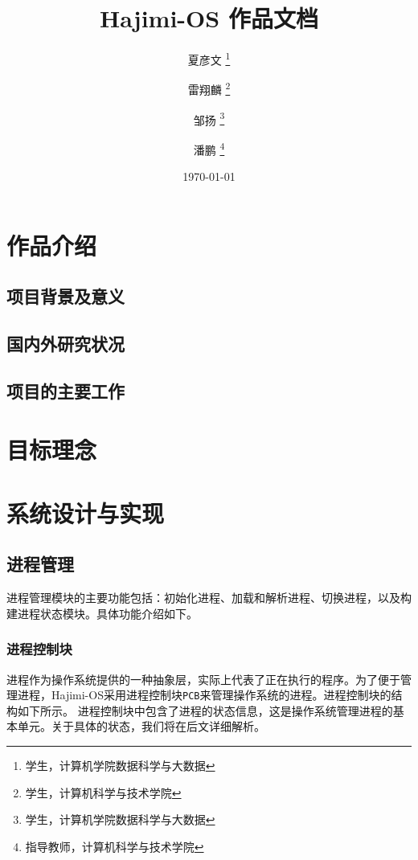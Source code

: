 \documentclass[UTF8]{article}
\begin{document}
\title{\Huge Hajimi-OS 作品文档}
\author{夏彦文 \thanks{学生，计算机学院数据科学与大数据} \and 雷翔麟 \thanks{学生，计算机科学与技术学院}
  \and 邹扬 \thanks{学生，计算机学院数据科学与大数据} \and 潘鹏 \thanks{指导教师，计算机科学与技术学院}}
\date{\today}
\maketitle

\newpage
\tableofcontents
\newpage


\section{作品介绍}
\subsection{项目背景及意义}
\subsection{国内外研究状况}
\subsection{项目的主要工作}
\section{目标理念}

\section{系统设计与实现}
\subsection{进程管理}
进程管理模块的主要功能包括：初始化进程、加载和解析进程、切换进程，以及构建进程状态模块。具体功能介绍如下。
\subsubsection{进程控制块}
进程作为操作系统提供的一种抽象层，实际上代表了正在执行的程序。为了便于管理进程，Hajimi-OS采用进程控制块\texttt{PCB}来管理操作系统的进程。进程控制块的结构如下所示。
进程控制块中包含了进程的状态信息，这是操作系统管理进程的基本单元。关于具体的状态，我们将在后文详细解析。

\end{document}
